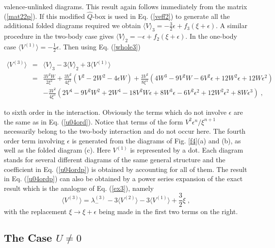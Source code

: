 \documentclass[prc,aps,amsmath,amssymb,preprintnumbers,showpacs,twocolumn]{revtex4}
\def\thalf{{\textstyle{\frac{1}{2}}}}
\def\threehalf{{\textstyle{\frac{3}{2}}}}
\newcommand{\bq}{\begin{eqnarray}}
\newcommand{\eq}{\end{eqnarray}}
\begin{document}
valence-unlinked diagrams. This result again follows immediately from the 
matrix (\ref{mat22p}). If this modified $\hat{Q}$-box is used in 
Eq. (\ref{veff2}) to generate all the additional folded diagrams required
we obtain 
$\langle V\rangle_3=-\threehalf\epsilon+f_3(\xi+\epsilon)$. A similar 
procedure in the two-body case gives 
$\langle V\rangle_2=-\epsilon+f_2(\xi+\epsilon)$.
In the one-body case $\langle V^{(1)}\rangle=-\thalf\epsilon$.
Then using Eq. (\ref{whole3}) 
\begin{widetext}
\bq
\langle V^{(3)}\rangle&=&\langle V\rangle_3-3\langle V\rangle_2
+3\langle V^{(1)}\rangle\nonumber\\
&=&\frac{3V^2W}{2\xi^2}+\frac{3V^2}{4\xi^3}(V^2-2W^2-4\epsilon W)
+\frac{3V^2}{8\xi^4}(4W^3-9V^2W-6V^2\epsilon+12W^2\epsilon+12W\epsilon^2)
\nonumber\\
&&-\frac{3V^2}{4\xi^5}(2V^4-9V^2W^2+2W^4-18V^2W\epsilon+8W^3\epsilon
-6V^2\epsilon^2+12W^2\epsilon^2+8W\epsilon^3)\;, \label{u04ordp}
\eq
\end{widetext}
to sixth order in the interaction. Obviously the terms which do not
involve $\epsilon$ are the same as in Eq. (\ref{u04ord}). Notice
that terms of the form $V^2\epsilon^n/\xi^{n+1}$ necessarily belong
to the two-body interaction and do not occur here.
The fourth order term involving  $\epsilon$ is generated from the 
diagrams of Fig. \ref{f4}(a) and (b), as well as the folded diagram (c). 
Here $V^{(1)}$ is represented by a dot. Each diagram stands for 
several different diagrams of the same general structure and the coefficient
in Eq. (\ref{u04ordp}) is obtained by accounting for all of them.
The result in Eq. (\ref{u04ordp}) can also be obtained
by a power series expansion of the exact result which is the analogue of
Eq. (\ref{ex3}), namely
\begin{equation}
\langle V^{(3)}\rangle=\lambda_-^{(3)}-3\langle V^{(2)}\rangle
-3\langle V^{(1)}\rangle+\threehalf\xi\;,\label{ex4}
\end{equation}
with the replacement $\xi\rightarrow\xi+\epsilon$ being made in the first 
two terms on the right.

\subsection{The Case $U\neq0$\label{subsecu1}}
\end{document}

